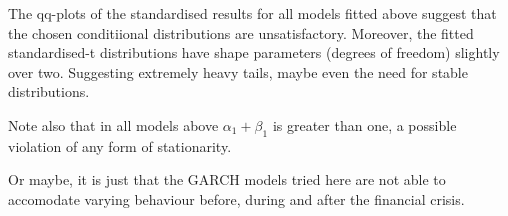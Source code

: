 \documentclass[article,nojss]{jss}
\begin{document}
The qq-plots of the standardised results for all models fitted above suggest that the chosen
conditiional distributions are unsatisfactory. Moreover, the fitted standardised-t
distributions have shape parameters (degrees of freedom) slightly over two. Suggesting
extremely heavy tails, maybe even the need for stable distributions.

Note also that in all models above $\alpha_{1} + \beta_{1}$ is greater than one, a possible
violation of any form of stationarity.

Or maybe, it is just that the GARCH models tried here are not able to accomodate varying
behaviour before, during and after the financial crisis.
\end{document}
